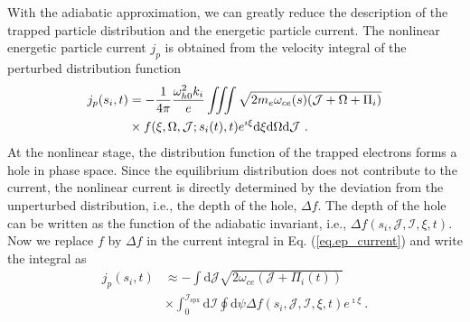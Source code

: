 With the adiabatic approximation, we can greatly reduce the description of the trapped particle distribution and the energetic particle current.
The nonlinear energetic particle current $j_p$ is obtained from the velocity integral of the perturbed distribution function 
\cite{zheng2024}
\begin{equation}\label{eq.ep_current}
    \begin{aligned}
j_p(s_i,t) & = -\frac{1}{ 4 \pi } \frac{\omega_{h0}^2k_i}{e}\iiint \sqrt{2m_e\omega_{ce}(s)(\mathcal{J}+\Omega+\Pi_i)} 
 \\
 &\times f(\xi,\Omega,\mathcal{J};s_i(t),t)e^{\imath \xi} \rm d \xi \rm d \Omega \rm d \mathcal{J}~.
    \end{aligned}
\end{equation}
At the nonlinear stage, the distribution function of the trapped electrons forms a hole in phase space.
Since the equilibrium distribution does not contribute to the current, the nonlinear current is directly determined by 
the deviation from the unperturbed distribution, i.e., the depth of the hole,
$\Delta f$.
The depth of the hole can be written as the function of the adiabatic invariant, i.e., $\Delta f(s_i,\mathcal{J},\mathcal{I},\xi,t)$.
Now we replace $f$ by $\Delta f$ in the current integral in Eq. (\ref{eq.ep_current}) and write  the integral as
\begin{equation}
\begin{aligned}
    j_p(s_i,t) & \approx - \int\mathrm{d} \mathcal{J} \sqrt{2 \omega_{ce} (\mathcal{J} + \Pi_i(t))}
    \\
    &\times \int_0^{\mathcal{I}_{\mathrm{s p x}}}  \mathrm{d}\mathcal{I}  \oint \mathrm{d}\psi  \Delta f(s_i,\mathcal{J},\mathcal{I},\xi,t)e^{\imath \xi}  ~.
\end{aligned}
\end{equation}
